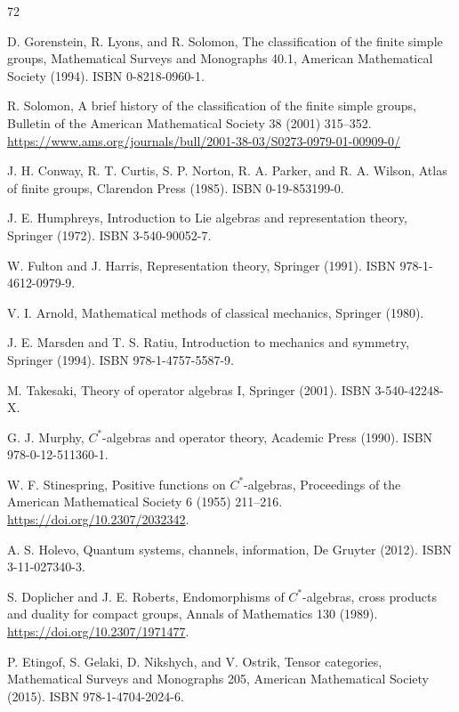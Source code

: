 \documentclass[11pt,letterpaper]{article}
\theoremstyle{definition}
\begin{document}
\begin{thebibliography}{72}
\small

 D. Gorenstein, R. Lyons, and R. Solomon, The classification of the finite simple groups, Mathematical Surveys and Monographs 40.1, American Mathematical Society (1994). ISBN 0-8218-0960-1.

 R. Solomon, A brief history of the classification of the finite simple groups, Bulletin of the American Mathematical Society 38 (2001) 315--352. \url{https://www.ams.org/journals/bull/2001-38-03/S0273-0979-01-00909-0/}

 J. H. Conway, R. T. Curtis, S. P. Norton, R. A. Parker, and R. A. Wilson, Atlas of finite groups, Clarendon Press (1985). ISBN 0-19-853199-0.

 J. E. Humphreys, Introduction to Lie algebras and representation theory, Springer (1972). ISBN 3-540-90052-7.

 W. Fulton and J. Harris, Representation theory, Springer (1991). ISBN 978-1-4612-0979-9.

 V. I. Arnold, Mathematical methods of classical mechanics, Springer (1980).

 J. E. Marsden and T. S. Ratiu, Introduction to mechanics and symmetry, Springer (1994). ISBN 978-1-4757-5587-9.

 M. Takesaki, Theory of operator algebras I, Springer (2001). ISBN 3-540-42248-X.

 G. J. Murphy, $C^*$-algebras and operator theory, Academic Press (1990). ISBN 978-0-12-511360-1.

 W. F. Stinespring, Positive functions on $C^*$-algebras, Proceedings of the American Mathematical Society 6 (1955) 211--216. \url{https://doi.org/10.2307/2032342}.

 A. S. Holevo, Quantum systems, channels, information, De Gruyter (2012). ISBN 3-11-027340-3.

 S. Doplicher and J. E. Roberts, Endomorphisms of $C^*$-algebras, cross products and duality for compact groups, Annals of Mathematics 130 (1989). \url{https://doi.org/10.2307/1971477}.

 P. Etingof, S. Gelaki, D. Nikshych, and V. Ostrik, Tensor categories, Mathematical Surveys and Monographs 205, American Mathematical Society (2015). ISBN 978-1-4704-2024-6.


\end{thebibliography}
\end{document}
